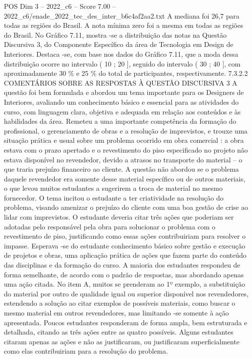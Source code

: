 \begin{textsample}{POS Dim 3 – 2022\_c6 – Score 7.00 – 2022\_c6/enade\_2022\_tec\_des\_inter\_b6c4af2aa2.txt}
A mediana foi 26,7 para todas as regiões do Brasil.
A nota mínima zero foi a mesma em todas as regiões do Brasil.
No Gráfico 7.11, mostra -se a distribuição das notas na Questão Discursiva 3, do Componente Específico da área de Tecnologia em Design de Interiores.
Destaca -se, com base nos dados do Gráfico 7.11, que a moda dessa distribuição ocorre no intervalo ( 10 ; 20 ], seguido do intervalo ( 30 ; 40 ], com aproximadamente 30 \% e 25 \% do total de participantes, respectivamente. 7.3.2.2 COMENTÁRIOS SOBRE AS RESPOSTAS À QUESTÃO DISCURSIVA 3 A questão foi bem formulada e abordou um tema importante para os Designers de Interiores, avaliando um conhecimento básico e essencial para as atividades do curso, com linguagem clara, objetiva e adequada em relação aos conteúdos e às habilidades da área.
Remeteu a uma importante competência da formação do profissional, o gerenciamento de obras e a resolução de imprevistos, e trouxe uma situação prática e usual sobre um problema ocorrido em obra comercial : a obra estava com o prazo apertado e o revestimento do piso especificado no projeto não estava disponível no revendedor, devido a atrasos no transporte do material – o que traria prejuízo financeiro ao cliente.
A questão não abordou se o problema daquele revendedor era somente desse material específico ou de outros materiais, o que levou muitos estudantes a sugerirem a troca de material no mesmo fornecedor.
O tema incitou o estudante a ter criatividade na resolução do problema, visando amenizar o prejuízo do cliente com uma boa gestão de crise ao lidar com imprevistos.
O estudante deveria citar três ações que poderiam ser adotadas pelo responsável pela obra para solucionar o problema com o revestimento de piso, justificando como essas ações contribuiriam para resolver o impasse.
Esperava -se do estudante conhecimento básico sobre gestão e execução de projetos e obras, uma aplicação prática de ações que fazem parte do conteúdo das disciplinas e da formação do curso.
A maioria dos estudantes respondeu de forma semelhante, de acordo com o padrão de respostas, mas abordando apenas uma ação citada.
No item A, muitos se prenderam ao 1º exemplo, a substituição do material por outro de qualidade igual ou superior disponível nos revendedores, estendendo a solução ao citar exemplos de possíveis materiais, como buscar o mesmo material em outros revendedores, mas limitando -se somente à ação apresentada.
Poucos estudantes responderam de forma ampla, bem estruturada e detalhada, citando as três ações entre as quatro possíveis.
Alguns estudantes citaram apenas as ações e não as justificaram, ou justificaram superficialmente como elas contribuiriam para a resolução do problema.

\end{textsample}
